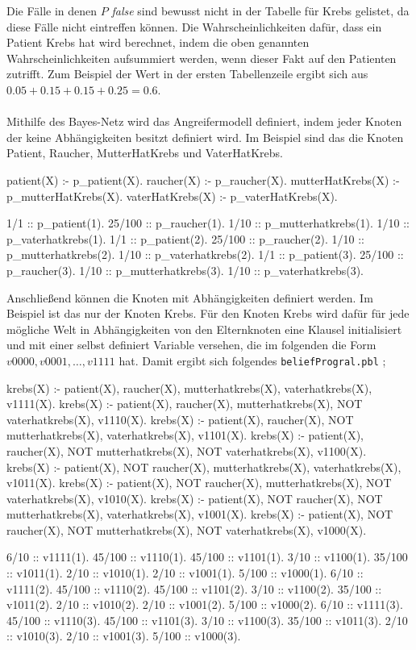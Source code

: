 \documentclass[german,version-2020-11]{uzl-thesis}
\begin{document}
\noindent 
Die Fälle in denen $P$ \textit{false} sind bewusst nicht in der Tabelle für Krebs gelistet, da diese Fälle nicht eintreffen können. Die Wahrscheinlichkeiten dafür, dass ein Patient Krebs hat wird berechnet, indem die oben genannten Wahrscheinlichkeiten aufsummiert werden, wenn dieser Fakt auf den Patienten zutrifft. Zum Beispiel der Wert in der ersten Tabellenzeile ergibt sich aus $0.05 + 0.15 + 0.15 +0.25 = 0.6$. \\ \\
Mithilfe des Bayes-Netz wird das Angreifermodell definiert, indem jeder Knoten der keine Abhängigkeiten besitzt definiert wird. Im Beispiel sind das die Knoten Patient, Raucher, MutterHatKrebs und VaterHatKrebs.
\begin{Pseudocode}[caption={Beispiel für Knoten ohne Abhängigkeiten }, label={lst-3}, numbers=left]
patient(X) :- p_patient(X).
raucher(X) :- p_raucher(X).
mutterHatKrebs(X) :- p_mutterHatKrebs(X).
vaterHatKrebs(X) :- p_vaterHatKrebs(X).
	
1/1 :: p_patient(1).
25/100 :: p_raucher(1).
1/10 :: p_mutterhatkrebs(1).
1/10 :: p_vaterhatkrebs(1).
1/1 :: p_patient(2).
25/100 :: p_raucher(2).
1/10 :: p_mutterhatkrebs(2).
1/10 :: p_vaterhatkrebs(2).
1/1 :: p_patient(3).
25/100 :: p_raucher(3).
1/10 :: p_mutterhatkrebs(3).
1/10 :: p_vaterhatkrebs(3).
\end{Pseudocode}
Anschließend können die Knoten mit Abhängigkeiten definiert werden. Im Beispiel ist das nur der Knoten Krebs. Für den Knoten Krebs wird dafür für jede mögliche Welt in Abhängigkeiten von den Elternknoten eine Klausel initialisiert und mit einer selbst definiert Variable versehen, die im folgenden die Form $v0000, v0001, \dots , v1111$ hat. Damit ergibt sich folgendes \texttt{beliefProgral.pbl} ; 
\begin{Pseudocode}[caption={Beispiel für Knoten mit Abhängigkeiten }, label={lst-3}, numbers=left]
krebs(X) :- patient(X), raucher(X), mutterhatkrebs(X), vaterhatkrebs(X), v1111(X).
krebs(X) :- patient(X), raucher(X), mutterhatkrebs(X), NOT vaterhatkrebs(X), v1110(X).
krebs(X) :- patient(X), raucher(X), NOT mutterhatkrebs(X), vaterhatkrebs(X), v1101(X).
krebs(X) :- patient(X), raucher(X), NOT mutterhatkrebs(X), NOT vaterhatkrebs(X), v1100(X).
krebs(X) :- patient(X), NOT raucher(X), mutterhatkrebs(X), vaterhatkrebs(X), v1011(X).
krebs(X) :- patient(X), NOT raucher(X), mutterhatkrebs(X), NOT vaterhatkrebs(X), v1010(X).
krebs(X) :- patient(X), NOT raucher(X), NOT mutterhatkrebs(X), vaterhatkrebs(X), v1001(X).
krebs(X) :- patient(X), NOT raucher(X), NOT mutterhatkrebs(X), NOT vaterhatkrebs(X), v1000(X).

6/10 :: v1111(1).
45/100 :: v1110(1).
45/100 :: v1101(1).
3/10 :: v1100(1).
35/100 :: v1011(1).
2/10 :: v1010(1).
2/10 :: v1001(1).
5/100 :: v1000(1).
6/10 :: v1111(2).
45/100 :: v1110(2).
45/100 :: v1101(2).
3/10 :: v1100(2).
35/100 :: v1011(2).
2/10 :: v1010(2).
2/10 :: v1001(2).
5/100 :: v1000(2).
6/10 :: v1111(3).
45/100 :: v1110(3).
45/100 :: v1101(3).
3/10 :: v1100(3).
35/100 :: v1011(3).
2/10 :: v1010(3).
2/10 :: v1001(3).
5/100 :: v1000(3).
\end{Pseudocode}
\end{document}
